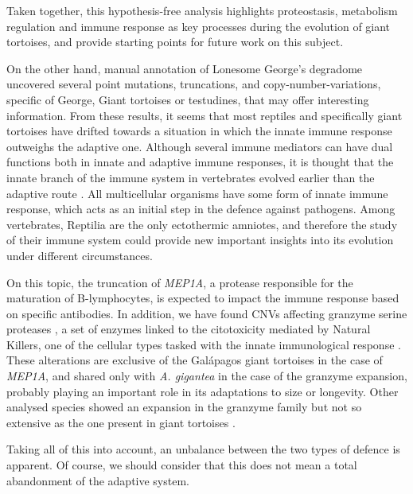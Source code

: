 Taken together, this hypothesis-free analysis highlights proteostasis, metabolism regulation and immune response as key processes during the evolution of giant tortoises, and provide starting points for future work on this subject.

On the other hand, manual annotation of Lonesome George's degradome uncovered several point mutations, truncations, and copy-number-variations, specific of George, Giant tortoises or testudines, that may offer interesting information.
From these results, it seems that most reptiles and specifically giant tortoises have drifted towards a situation in which the innate immune response outweighs the adaptive one.
Although several immune mediators can have dual functions both in innate and adaptive immune responses, it is thought that the innate branch of the immune system in vertebrates evolved earlier than the adaptive route \cite{Zimmerman2010}.
All multicellular organisms have some form of innate immune response, which acts as an initial step in the defence against pathogens.
Among vertebrates, Reptilia are the only ectothermic amniotes, and therefore the study of their immune system could provide new important insights into its evolution under different circumstances.

On this topic, the truncation of \textit{MEP1A}, a protease responsible for the maturation of B-lymphocytes, is expected to impact the immune response based on specific antibodies.
In addition, we have found CNVs affecting granzyme serine proteases%
, a set of enzymes linked to the citotoxicity mediated by Natural Killers, one of the cellular types tasked with the innate immunological response \cite{Voskoboinik2015}.
These alterations are exclusive of the Gal\'{a}pagos giant tortoises in the case of \textit{MEP1A}, and shared only with \textit{A. gigantea} in the case of the granzyme expansion, probably playing an important role in its adaptations to size or longevity.
Other analysed species showed an expansion in the granzyme family but not so extensive as the one present in giant tortoises%
.

Taking all of this into account, an unbalance between the two types of defence is apparent.
Of course, we should consider that this does not mean a total abandonment of the adaptive system.

